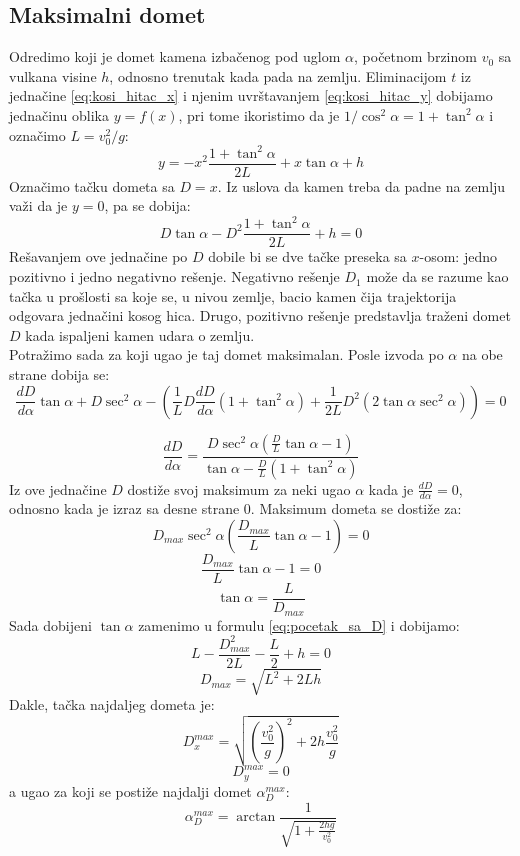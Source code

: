 \documentclass[a4paper]{article}
\begin{document}
\subsection{Maksimalni domet}
\label{sec:max_domet}
Odredimo koji je domet kamena izbačenog pod uglom $\alpha$, početnom brzinom $v_0$ sa 
vulkana visine $h$, odnosno trenutak kada pada na zemlju. 
Eliminacijom $t$ iz jednačine \ref{eq:kosi_hitac_x} i njenim uvrštavanjem 
\ref{eq:kosi_hitac_y} dobijamo jednačinu oblika $y=f(x)$, 
pri tome ikoristimo da je $1/\cos^2\alpha = 1+\tan^2\alpha$ 
i označimo $L = v_0^2/g$:
\begin{equation}
\label{eq:kosi_hitac_xy}
y = - x^2\frac{1+\tan^2 \alpha}{2L} + x \tan \alpha + h
\end{equation}
Označimo tačku dometa sa $D = x$.
Iz uslova da kamen treba da padne na zemlju važi da je $y = 0$, pa se dobija:
\begin{equation}
\label{eq:pocetak_sa_D}
D \tan \alpha - D^2\frac{1+\tan^2 \alpha}{2L} + h = 0
\end{equation}
Rešavanjem ove jednačine po $D$ dobile bi se dve tačke preseka sa $x$-osom: jedno pozitivno
i jedno negativno rešenje.
Negativno rešenje $D_1$ može da se razume kao tačka u prošlosti sa koje se, 
u nivou zemlje, bacio kamen čija trajektorija odgovara jednačini kosog hica. Drugo,
pozitivno rešenje predstavlja traženi domet $D$ kada ispaljeni kamen udara o zemlju.\\

Potražimo sada za koji ugao je taj domet maksimalan.
Posle izvoda po $\alpha$ na obe strane dobija se:
$$ \frac{dD}{d\alpha}\tan\alpha 
+ D \sec^2 \alpha - 
\left( \frac1L D \frac{dD}{d\alpha}(1+\tan^2\alpha) + 
\frac{1}{2L} D^2(2\tan\alpha \sec^2\alpha) \right) = 0 $$

$$ \frac{dD}{d\alpha} = 
\frac{D \sec^2\alpha(\frac{D}{L} \tan \alpha - 1)}
{\tan\alpha-\frac{D}{L}(1 + \tan^2 \alpha)} $$
Iz ove jednačine $D$ dostiže svoj maksimum za neki ugao $\alpha$ 
kada je $\frac{dD}{d\alpha} = 0$, odnosno kada je izraz
sa desne strane 0. Maksimum dometa se dostiže za:
$$ D_{max} \sec^2 \alpha (\frac{D_{max}}{L} \tan \alpha - 1) = 0 $$
$$ \frac{D_{max}}{L}\tan\alpha-1 = 0 $$
$$ \tan \alpha = \frac{L}{D_{max}} $$
Sada dobijeni $\tan \alpha$ zamenimo u formulu \ref{eq:pocetak_sa_D} i dobijamo:
$$ L - \frac{D_{max}^2}{2L} - \frac{L}{2} + h = 0 $$
$$ D_{max} = \sqrt{L^2 + 2Lh} $$
Dakle, tačka najdaljeg dometa je:
\begin{equation}
\label{eq:Dmax_x}
D^{max}_x = \sqrt{\left(\frac{v_0^2}{g}\right)^2 + 2h\frac{v_0^2}{g}}
\end{equation}
\begin{equation}
\label{eq:Dmax_y}
D^{max}_y = 0
\end{equation}
a ugao za koji se postiže najdalji domet $\alpha^{max}_{D}$:
\begin{equation}
\label{eq:Dmax_alpha}
 \alpha^{max}_{D} = \arctan \frac{1}{\sqrt{1 + \frac{2hg}{v_0^2}}}
\end{equation}
\end{document}
